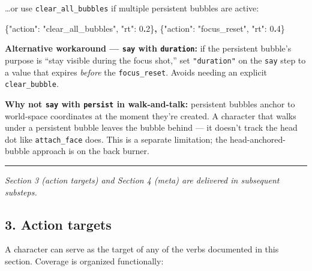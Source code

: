 \documentclass[
  12pt,
  letterpaper,
]{book}
\newenvironment{Shaded}{}{}
\newcommand{\DataTypeTok}[1]{\textcolor[rgb]{0.56,0.13,0.00}{#1}}
\newcommand{\DecValTok}[1]{\textcolor[rgb]{0.25,0.63,0.44}{#1}}
\newcommand{\ErrorTok}[1]{\textcolor[rgb]{1.00,0.00,0.00}{\textbf{#1}}}
\newcommand{\FunctionTok}[1]{\textcolor[rgb]{0.02,0.16,0.49}{#1}}
\newcommand{\StringTok}[1]{\textcolor[rgb]{0.25,0.44,0.63}{#1}}
\begin{document}
\ldots or use \texttt{clear\_all\_bubbles} if multiple persistent
bubbles are active:

\begin{Shaded}
\begin{Highlighting}[]
\FunctionTok{\{}\DataTypeTok{"action"}\FunctionTok{:} \StringTok{"clear\_all\_bubbles"}\FunctionTok{,} \DataTypeTok{"rt"}\FunctionTok{:} \DecValTok{0}\ErrorTok{.}\DecValTok{2}\FunctionTok{\}}\ErrorTok{,}
\FunctionTok{\{}\DataTypeTok{"action"}\FunctionTok{:} \StringTok{"focus\_reset"}\FunctionTok{,} \DataTypeTok{"rt"}\FunctionTok{:} \DecValTok{0}\ErrorTok{.}\DecValTok{4}\FunctionTok{\}}
\end{Highlighting}
\end{Shaded}

\textbf{Alternative workaround --- \texttt{say} with \texttt{duration}:}
if the persistent bubble's purpose is ``stay visible during the focus
shot,'' set \texttt{"duration"} on the \texttt{say} step to a value that
expires \emph{before} the \texttt{focus\_reset}. Avoids needing an
explicit \texttt{clear\_bubble}.

\textbf{Why not \texttt{say} with \texttt{persist} in walk-and-talk:}
persistent bubbles anchor to world-space coordinates at the moment
they're created. A character that walks under a persistent bubble leaves
the bubble behind --- it doesn't track the head dot like
\texttt{attach\_face} does. This is a separate limitation; the
head-anchored-bubble approach is on the back burner.

\begin{center}\rule{0.5\linewidth}{0.5pt}\end{center}

\emph{Section 3 (action targets) and Section 4 (meta) are delivered in
subsequent substeps.}

\subsection{3. Action targets}\label{action-targets}

A character can serve as the target of any of the verbs documented in
this section. Coverage is organized functionally:
\end{document}
